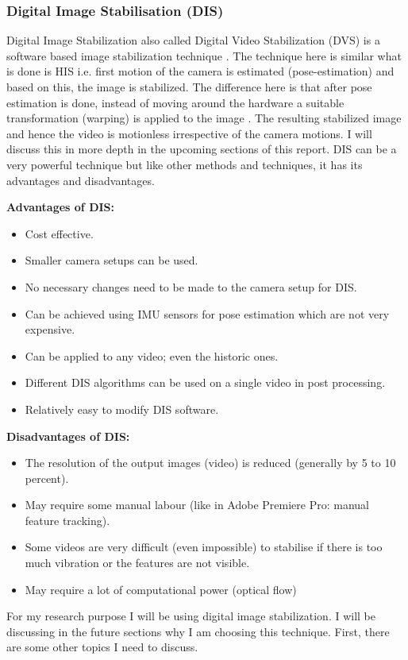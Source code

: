 \subsubsection{Digital Image Stabilisation (DIS)}
Digital Image Stabilization also called Digital Video Stabilization (DVS) is a software based image stabilization technique \citep{dis_review}. The technique here is similar what is done is HIS i.e. first motion of the camera is estimated (pose-estimation) and based on this, the image is stabilized. The difference here is that after pose estimation is done, instead of moving around the hardware a suitable transformation (warping) is applied to the image \citep{dis_feat_track}. The resulting stabilized image and hence the video is motionless irrespective of the camera motions. I will discuss this in more depth in the upcoming sections of this report. DIS can be a very powerful technique but like other methods and techniques, it has its advantages and disadvantages.

\textbf{Advantages of DIS: }
\begin{itemize}
\item Cost effective.
\item Smaller camera setups can be used.
\item No necessary changes need to be made to the camera setup for DIS.
\item Can be achieved using IMU sensors for pose estimation which are not very expensive.
\item Can be applied to any video; even the historic ones.
\item Different DIS algorithms can be used on a single video in post processing.
\item Relatively easy to modify DIS software.
\end{itemize}

\textbf{Disadvantages of DIS:}
\begin{itemize}
\item The resolution of the output images (video) is reduced (generally by 5 to 10 percent).
\item May require some manual labour (like in Adobe Premiere Pro: manual feature tracking).
\item Some videos are very difficult (even impossible) to stabilise if there is too much vibration or the features are not visible.
\item May require a lot of computational power (optical flow)
\end{itemize}
For my research purpose I will be using digital image stabilization.  I will be discussing in the future sections why I am choosing this technique. First, there are some other topics I need to discuss.

